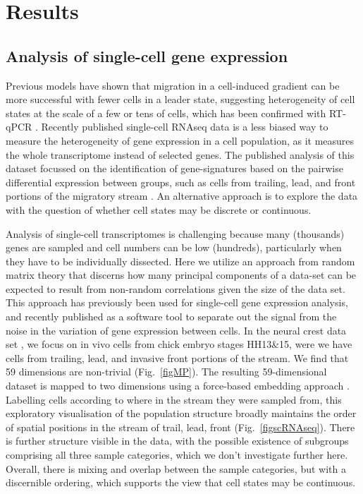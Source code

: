 \documentclass[review]{elsarticle}
\begin{document}
\section{Results}
\subsection{Analysis of single-cell gene expression}
Previous models have shown that migration in a cell-induced gradient can be more successful with fewer cells in a leader state, suggesting heterogeneity of cell states at the scale of a few or tens of cells, which has been confirmed with RT-qPCR \cite{McLennan2015}. Recently published single-cell RNAseq data \cite{Morrison2017} is a less biased way to measure the heterogeneity of gene expression in a cell population, as it measures the whole transcriptome instead of selected genes. The published analysis of this dataset focussed on the identification of gene-signatures based on the pairwise differential expression between groups, such as cells from trailing, lead, and front portions of the migratory stream \cite{Morrison2017}. An alternative approach is to explore the data with the question of whether cell states may be discrete or continuous.

Analysis of single-cell transcriptomes is challenging because many (thousands) genes are sampled and cell numbers can be low (hundreds), particularly when they have to be individually dissected. Here we utilize an approach from random matrix theory that discerns how many principal components of a data-set can be expected to result from non-random correlations given the size of the data set. This approach has previously been used for single-cell gene expression analysis\cite{Klein2015a}, and recently published as a software tool \cite{Aparicio2018} to separate out the signal from the noise in the variation of gene expression between cells. In the neural crest data set \cite{Morrison2017}, we focus on in vivo cells from chick embryo stages HH13\&15, were we have cells from trailing, lead, and invasive front portions of the stream. We find that 59 dimensions are non-trivial (Fig.~\ref{figMP}). The resulting 59-dimensional dataset is mapped to two dimensions using a force-based embedding approach \cite{Weinreb2018}. Labelling cells according to where in the stream they were sampled from, this exploratory visualisation of the population structure broadly maintains the order of spatial positions in the stream of trail, lead, front (Fig.~\ref{figscRNAseq}). There is further structure visible in the data, with the possible existence of subgroups comprising all three sample categories, which we don't investigate further here. Overall, there is mixing and overlap between the sample categories, but with a discernible ordering, which supports the view that cell states may be continuous.
\end{document}
